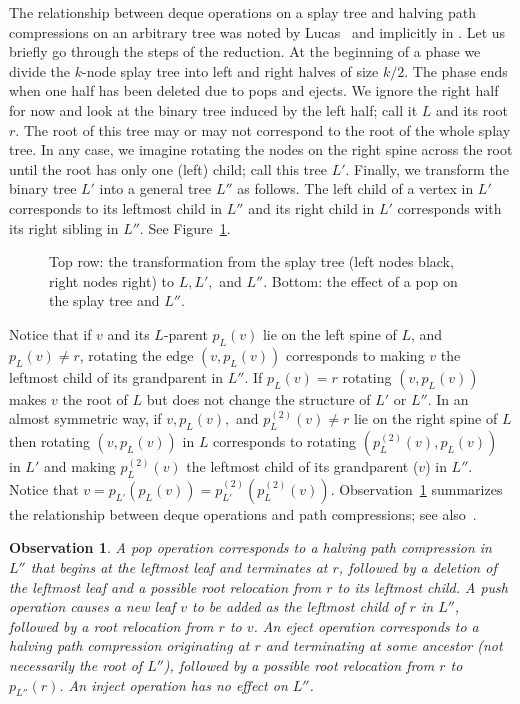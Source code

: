 \documentclass{article}
\newtheorem{observation}[theorem]{Observation}
\begin{document}
The relationship between deque operations on a splay tree and halving path compressions
on an arbitrary tree was noted by Lucas~\cite{Lucas90,Lucas91} and implicitly in \cite{Tar85,Sundar92}.  
Let us briefly
go through the steps of the reduction.  At the beginning of a phase we divide the $k$-node splay tree
into left and right halves of size $k/2$.  The phase ends when one half has been deleted due to pops
and ejects.   We ignore the right half for now and look at the binary tree induced by the left half; call it $L$ and its root $r$.
The root of this tree may or may not correspond to the root of the whole splay tree.  In any case, we imagine
rotating the nodes on the right spine across the root until the root has only one (left) child; call this tree $L'$.
Finally, we transform the binary tree $L'$ into a general tree $L''$ as follows.  The left
child of a vertex in $L'$ corresponds to its leftmost child in $L''$ and its right child in $L'$ corresponds
with its right sibling in $L''$.  See Figure~\ref{fig:equiv}.
\begin{figure}[h!]
\begin{center}
\end{center}
\caption{\label{fig:equiv}Top row: the transformation from the splay tree (left nodes black, right nodes right) to $L,L',$ and $L''$.
Bottom: the effect of a pop on the splay tree and $L''$.}
\end{figure}
Notice that if $v$ and its $L$-parent $p_L(v)$ lie on the left spine of $L$, and $p_L(v) \not= r$,
rotating the edge 
$(v,p_L(v))$ corresponds to making $v$ the leftmost child of its grandparent in $L''$.  If $p_L(v) = r$ rotating
$(v,p_L(v))$ makes $v$ the root of $L$ but does not change the structure of $L'$ or $L''$.  In an almost symmetric
way, if $v,p_L(v),$ and $p_L^{(2)}(v)\not= r$ lie on the right spine of $L$ then rotating $(v,p_L(v))$ in $L$
corresponds to rotating $(p_L^{(2)}(v), p_L(v))$ in $L'$ and making $p_L^{(2)}(v)$ the leftmost child of its grandparent ($v$) in $L''$.
Notice that $v = p_{L'}(p_L(v)) = p_{L'}^{(2)}(p_L^{(2)}(v))$.  Observation~\ref{obs:equiv} summarizes the relationship
between deque operations and path compressions; see also~\cite{Lucas91,Sundar92}.

\begin{observation}\label{obs:equiv}
A pop operation corresponds to a halving path compression in $L''$ that begins at the leftmost leaf and terminates at $r$,
followed by a deletion of the leftmost leaf and a possible {\em root relocation} from $r$ to its leftmost child.
A push operation causes a new leaf $v$ to be added as the leftmost child of $r$ in $L''$, followed by a root relocation from $r$ to $v$.
An eject operation corresponds to a halving path compression originating at $r$ and terminating at some ancestor (not necessarily the root of $L''$),
followed by a possible root relocation from $r$ to $p_{L''}(r)$.  An inject operation has no effect on $L''$.
\end{observation}
\end{document}
